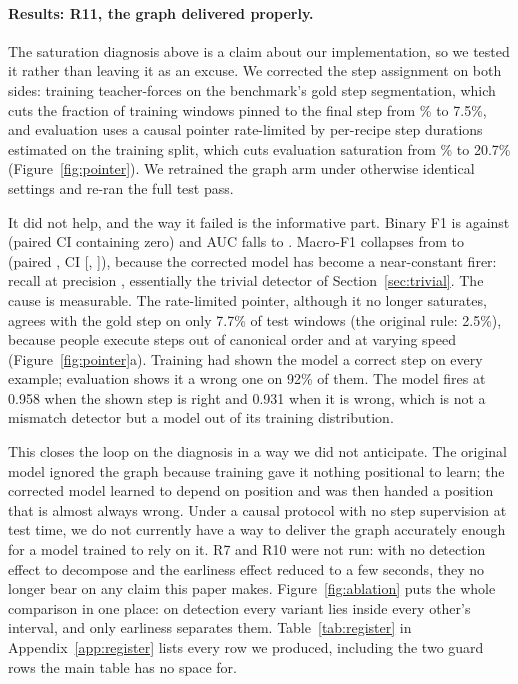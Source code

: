 \documentclass[10pt,twocolumn]{article}
\begin{document}
\paragraph{Results: R11, the graph delivered properly.}
The saturation diagnosis above is a claim about our implementation, so we
tested it rather than leaving it as an excuse. We corrected the step assignment
on both sides: training teacher-forces on the benchmark's gold step
segmentation, which cuts the fraction of training windows pinned to the final
step from \satTrain{}\% to 7.5\%, and evaluation uses a causal pointer
rate-limited by per-recipe step durations estimated on the training split,
which cuts evaluation saturation from \satPct{}\% to 20.7\%
(Figure~\ref{fig:pointer}). We retrained the graph arm under otherwise identical
settings and re-ran the full test pass.

It did not help, and the way it failed is the informative part. Binary F1 is
\fxF{} against \resF{} (paired CI containing zero) and AUC falls to \fxAUC{}.
Macro-F1 collapses from \resMacro{} to \fxMacro{} (paired \fxMacroDelta{},
CI [\fxMacroLo{}, \fxMacroHi{}]), because the corrected model has become a
near-constant firer: recall \fxR{} at precision \fxP{}, essentially the trivial
detector of Section~\ref{sec:trivial}. The cause is measurable. The rate-limited
pointer, although it no longer saturates, agrees with the gold step on only
7.7\% of test windows (the original rule: 2.5\%), because people execute steps
out of canonical order and at varying speed (Figure~\ref{fig:pointer}a).
Training had shown the model a correct step on every example; evaluation shows
it a wrong one on 92\% of them. The model fires at 0.958 when the shown step is
right and 0.931 when it is wrong, which is not a mismatch detector but a model
out of its training distribution.

This closes the loop on the diagnosis in a way we did not anticipate. The
original model ignored the graph because training gave it nothing positional to
learn; the corrected model learned to depend on position and was then handed a
position that is almost always wrong. Under a causal protocol with no step
supervision at test time, we do not currently have a way to deliver the graph
accurately enough for a model trained to rely on it. R7 and R10 were not run:
with no detection effect to decompose and the earliness effect reduced to a few
seconds, they no longer bear on any claim this paper makes.
Figure~\ref{fig:ablation} puts the whole comparison in one place: on detection
every variant lies inside every other's interval, and only earliness separates
them. Table~\ref{tab:register} in Appendix~\ref{app:register} lists every row we
produced, including the two guard rows the main table has no space for.
\end{document}

